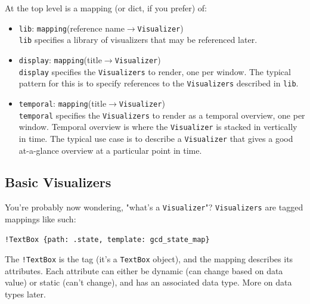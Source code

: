 \documentclass[11pt]{article}
\begin{document}
At the top level is a mapping (or dict, if you prefer) of:
\begin{itemize}
  \item \texttt{lib}: \texttt{mapping}(reference name$\rightarrow$\texttt{Visualizer}) \\
  \texttt{lib} specifies a library of visualizers that may be referenced later.

  \item \texttt{display}: \texttt{mapping}(title$\rightarrow$\texttt{Visualizer}) \\
  \texttt{display} specifies the \texttt{Visualizers} to render, one per window. The typical pattern for this is to specify references to the \texttt{Visualizers} described in \texttt{lib}.
  
  \item \texttt{temporal}: \texttt{mapping}(title$\rightarrow$\texttt{Visualizer}) \\
  \texttt{temporal} specifies the \texttt{Visualizers} to render as a temporal overview, one per window. Temporal overview is where the \texttt{Visualizer} is stacked in vertically in time. The typical use case is to describe a \texttt{Visualizer} that gives a good at-a-glance overview at a particular point in time.
\end{itemize}

\subsection{Basic Visualizers}
You're probably now wondering, "what's a \texttt{Visualizer}"? \texttt{Visualizers} are tagged mappings like such:
\begin{verbatim}
!TextBox {path: .state, template: gcd_state_map}
\end{verbatim}
The \texttt{!TextBox} is the tag (it's a \texttt{TextBox} object), and the mapping describes its attributes. Each attribute can either be dynamic (can change based on data value) or static (can't change), and has an associated data type. More on data types later.
\end{document}
